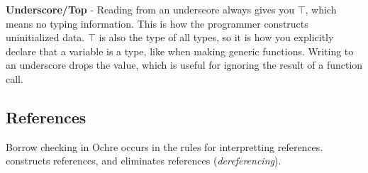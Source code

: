 \documentclass[12pt,twoside]{report}
\begin{document}
\textbf{Underscore/Top} - Reading from an underscore always gives you $\top$, which means no typing information. This is how the programmer constructs uninitialized data. $\top$ is also the type of all types, so it is how you explicitly declare that a variable is a type, like when making generic functions. Writing to an underscore drops the value, which is useful for ignoring the result of a function call.

\subsection{References}
\label{section:formalreferences}
Borrow checking in Ochre occurs in the rules for interpretting references. \mono{\&} constructs references, and \mono{*} eliminates references (\textit{dereferencing}).
\end{document}
